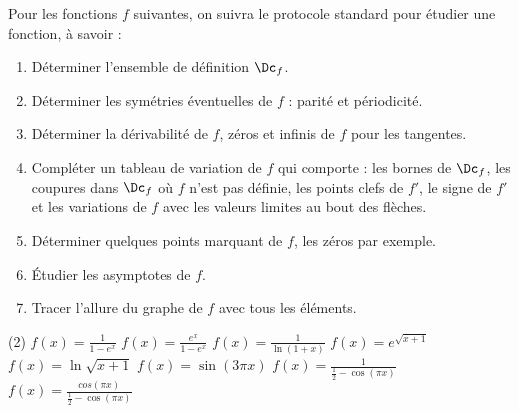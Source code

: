 %
%
Pour les fonctions $f$ suivantes, on suivra le protocole standard pour étudier une fonction, à savoir :
\begin{enumerate}
	\item Déterminer l'ensemble de définition $\Dc_f$.
	\item Déterminer les symétries éventuelles de $f$ : parité et périodicité.
	\item Déterminer la dérivabilité de $f$,  zéros et infinis de $f$ pour les tangentes.
	\item Compléter un tableau de variation de $f$ qui comporte : les bornes de $\Dc_f$, les coupures dans $\Dc_f$ où $f$ n'est pas définie, les points clefs de $f'$, le signe de $f'$ et les variations de $f$ avec les valeurs limites au bout des flèches.
	\item Déterminer quelques points marquant de $f$, les zéros par exemple.
	\item Étudier les asymptotes de $f$.
	\item Tracer l'allure du graphe de $f$ avec tous les éléments.
\end{enumerate}
	\begin{tasks}(2)
		\task $f(x)= \frac{1}{1-e^x}$
	    \task $f(x)= \frac{e^x}{1-e^x}$
		\task $f(x)= \frac{1}{\ln(1+x)}$
		\task $f(x)= e^{\sqrt{x+1}}$
	    \task $f(x)= \ln{\sqrt{x+1}}$
	    \task $f(x)= \sin(3 \pi x)$
	    \task $f(x)= \frac{1}{\frac{1}{2}-\cos(\pi x)}$
	    \task $f(x)= \frac{cos(\pi x)}{\frac{1}{2}-\cos(\pi x)}$
	\end{tasks}
